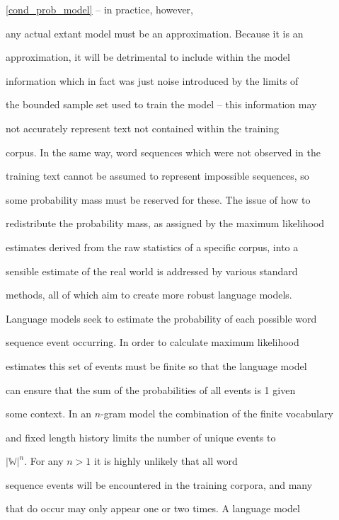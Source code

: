 \ref{cond_prob_model} -- in practice, however,


any actual extant model must be an approximation. Because it is an


approximation, it will be detrimental to include within the model


information which in fact was just noise introduced by the limits of


the bounded sample set used to train the model -- this information may


not accurately represent text not contained within the training


corpus. In the same way, word sequences which were not observed in the


training text cannot be assumed to represent impossible sequences, so


some probability mass must be reserved for these. The issue of how to


redistribute the probability mass, as assigned by the maximum likelihood


estimates derived from the raw statistics of a specific corpus, into a


sensible estimate of the real world is addressed by various standard


methods, all of which aim to create more robust language models.





\label{discounting_and_other_fun_things}


Language models seek to estimate the probability of each possible word


sequence event occurring. In order to calculate maximum likelihood


estimates this set of events must be finite so that the language model


can ensure that the sum of the probabilities of all events is 1 given


some context. In an $n$-gram model the combination of the finite vocabulary


and fixed length history limits the number of unique events to


$|\mathbb{W}|^n$.  For any $n>1$ it is highly unlikely that all word


sequence events will be encountered in the training corpora, and many


that do occur may only appear one or two times. A language model


